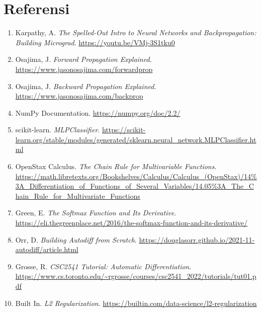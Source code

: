 \section*{Referensi}

\begin{enumerate}
    \item Karpathy, A. \textit{The Spelled-Out Intro to Neural Networks and
          Backpropagation: Building Micrograd}. \url{https://youtu.be/VMj-3S1tku0}

    \item Osajima, J. \textit{Forward Propagation Explained}.
          \url{https://www.jasonosajima.com/forwardprop}

    \item Osajima, J. \textit{Backward Propagation Explained}.
          \url{https://www.jasonosajima.com/backprop}

    \item NumPy Documentation. \url{https://numpy.org/doc/2.2/}

    \item scikit-learn. \textit{MLPClassifier}.
          \url{https://scikit-learn.org/stable/modules/generated/sklearn.neural_network.MLPClassifier.html}

    \item OpenStax Calculus. \textit{The Chain Rule for Multivariable Functions}.
          \url{https://math.libretexts.org/Bookshelves/Calculus/Calculus_(OpenStax)/14\%3A_Differentiation_of_Functions_of_Several_Variables/14.05\%3A_The_Chain_Rule_for_Multivariate_Functions}

    \item Green, E. \textit{The Softmax Function and Its Derivative}.
          \url{https://eli.thegreenplace.net/2016/the-softmax-function-and-its-derivative/}

    \item Orr, D. \textit{Building Autodiff from Scratch}.
          \url{https://douglasorr.github.io/2021-11-autodiff/article.html}

    \item Grosse, R. \textit{CSC2541 Tutorial: Automatic Differentiation}.
          \url{https://www.cs.toronto.edu/~rgrosse/courses/csc2541_2022/tutorials/tut01.pdf}

    \item Built In. \textit{L2 Regularization}.
          \url{https://builtin.com/data-science/l2-regularization}
\end{enumerate}
\pagebreak
\appendix
